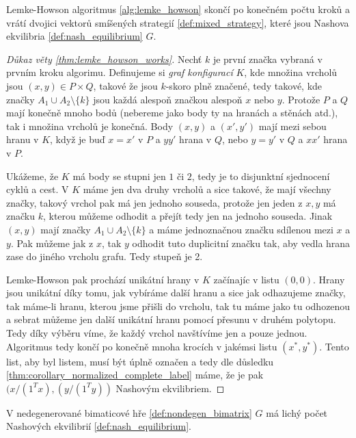 \begin{theorem}
\label{thm:lemke_howson_works}
Lemke-Howson algoritmus \ref{alg:lemke_howson} skončí po konečném počtu kroků a vrátí dvojici vektorů smíšených strategií \ref{def:mixed_strategy}, které jsou Nashova ekvilibria \ref{def:nash_equilibrium} $G$. 
\end{theorem}
\begin{proof}[Důkaz věty \ref{thm:lemke_howson_works}]
Nechť $k$ je první značka vybraná v prvním kroku algorimu. 
Definujeme si \textit{graf konfigurací} $K$, kde množina vrcholů jsou $(x,y) \in P \times Q$, takové že jsou $k$-skoro plně značené, tedy takové, kde značky $A_1 \cup A_2 \setminus \{k\}$ jsou každá alespoň značkou alespoň $x$ nebo $y$. 
Protože $P$ a $Q$ mají konečně mnoho bodů (nebereme jako body ty na hranách a stěnách atd.), tak i množina vrcholů je konečná. 
Body $(x,y)$ a $(x',y')$ mají mezi sebou hranu v $K$, když je buď $x = x'$ v $P$ a $yy'$ hrana v $Q$, nebo $y = y'$ v $Q$ a $xx'$ hrana v $P$. 

Ukážeme, že $K$ má body se stupni jen $1$ či $2$, tedy je to disjunktní sjednocení cyklů a cest. 
V $K$ máme jen dva druhy vrcholů a sice takové, že mají všechny značky, takový vrchol pak má jen jednoho souseda, protože jen jeden z $x,y$ má značku $k$, kterou můžeme odhodit a přejít tedy jen na jednoho souseda. 
Jinak $(x,y)$ mají značky $A_1 \cup A_2 \setminus \{k\}$ a máme jednoznačnou značku sdílenou mezi $x$ a $y$. 
Pak můžeme jak z $x$, tak $y$ odhodit tuto duplicitní značku tak, aby vedla hrana zase do jiného vrcholu grafu. 
Tedy stupeň je 2. 

Lemke-Howson pak prochází unikátní hrany v $K$ začínajíc v listu $(0,0)$. 
Hrany jsou unikátní díky tomu, jak vybíráme další hranu a sice jak odhazujeme značky, tak máme-li hranu, kterou jsme přišli do vrcholu, tak tu máme jako tu odhozenou a sebrat můžeme jen další unikátní hranu pomocí přesunu v druhém polytopu. 
Tedy díky výběru víme, že každý vrchol navštívíme jen a pouze jednou. 
Algoritmus tedy končí po konečně mnoha krocích v jakémsi listu $(x^*,y^*)$. 
Tento list, aby byl listem, musí být úplně označen a tedy dle důsledku \ref{thm:corollary_normalized_complete_label} máme, že je pak $(x/(1^Tx), (y/(1^Ty))$ Nashovým ekvilibriem.
\end{proof}

\begin{theorem}
\label{thm:corollary_nash_odd}
V nedegenerované bimaticové hře \ref{def:nondegen_bimatrix} $G$ má lichý počet Nashových ekvilibrií \ref{def:nash_equilibrium}.
\end{theorem}

